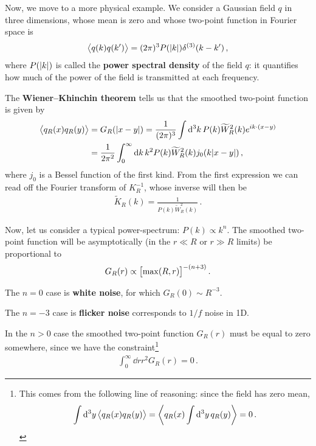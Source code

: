\documentclass[main.tex]{subfiles}
\begin{document}
Now, we move to a more physical example. We consider a Gaussian field \(q\) in three dimensions, whose mean is zero and whose two-point function in Fourier space is 
%
\begin{align}
\expval{q(k) q(k')} = (2 \pi )^3 P(\abs{k}) \delta^{(3)} (k - k')
\,,
\end{align}
%
where \(P(\abs{k})\) is called the \textbf{power spectral density} of the field \(q\): it quantifies how much of the power of the field is transmitted at each frequency. 

The \textbf{Wiener–Khinchin theorem} tells us that the smoothed two-point function is given by 
%
\begin{align}
\expval{q_R (x) q_R(y)} &= G_R ( \abs{x-y}) = \frac{1}{(2 \pi )^3}
\int \dd[3]{k} P(k) \widetilde{W}^2_R(k) e^{i k \cdot (x-y)}  \\
&= \frac{1}{2 \pi^2} \int_0^{\infty } \dd{k } k^2 P(k) \widetilde{W}^2_R (k) j_0 (k \abs{x-y})
\,,
\end{align}
%
where \(j_0 \) is a Bessel function of the first kind. 
From the first expression we can read off the Fourier transform of \(K^{-1}_R\), whose inverse will then be 
%
\begin{align}
\widetilde{K}_R (k) = \frac{1}{P(k) \widetilde{W}_R^2(k)} 
\,.
\end{align}

Now, let us consider a typical power-spectrum: \(P(k) \propto k^{n}\). 
The smoothed two-point function will be asymptotically (in the \(r \ll R\) or \(r \gg R\) limits) be proportional to
%
\begin{align}
G_R (r) \propto \qty[\max(R, r)]^{- (n+3)}
\,.
\end{align}

The \(n = 0\) case is \textbf{white noise}, for which \(G_R(0) \sim R^{-3}\). 

The \(n = -3\) case is \textbf{flicker noise} corresponds to \(1/f\) noise in 1D.

In the \(n > 0\) case the smoothed two-point function \(G_R(r)\) must be equal to zero somewhere, since we have the constraint\footnote{This comes from the following line of reasoning: since the field has zero mean, 
%
\begin{align}
\int \dd[3]{y} \expval{q_R (x) q_R (y)} = \expval{q_R (x) \int \dd[3]{y} q_R(y)} = 0
\,.
\end{align}}
%
\begin{align}
\int_0^{\infty } \dd{r} r^2 G_R(r) = 0
\,.
\end{align}
\end{document}
